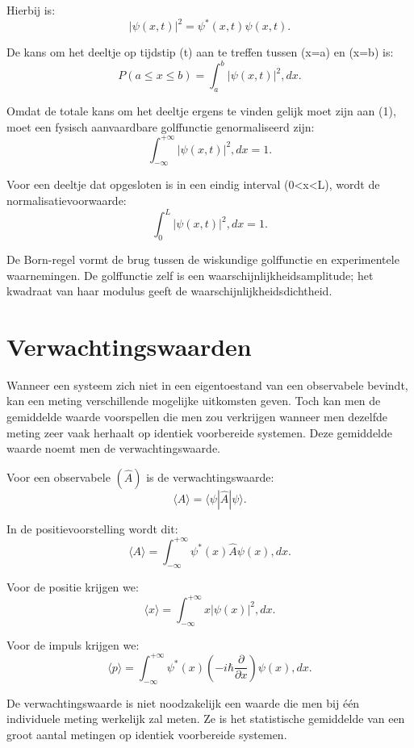 \documentclass{report} %
\begin{document}
    Hierbij is:
    \[
        |\psi(x,t)|^2=\psi^*(x,t)\psi(x,t).
    \]

    De kans om het deeltje op tijdstip (t) aan te treffen tussen (x=a) en (x=b) is:
    \[
        P(a\leq x\leq b)
        =
        \int_a^b |\psi(x,t)|^2,dx.
    \]

    Omdat de totale kans om het deeltje ergens te vinden gelijk moet zijn aan (1), moet een fysisch aanvaardbare golffunctie genormaliseerd zijn:
    \[
        \int_{-\infty}^{+\infty}|\psi(x,t)|^2,dx=1.
    \]

    Voor een deeltje dat opgesloten is in een eindig interval (0<x<L), wordt de normalisatievoorwaarde:
    \[
        \int_0^L |\psi(x,t)|^2,dx=1.
    \]

    De Born-regel vormt de brug tussen de wiskundige golffunctie en experimentele waarnemingen. De golffunctie zelf is een waarschijnlijkheidsamplitude; het kwadraat van haar modulus geeft de waarschijnlijkheidsdichtheid.


    \section{Verwachtingswaarden}

    Wanneer een systeem zich niet in een eigentoestand van een observabele bevindt, kan een meting verschillende mogelijke uitkomsten geven. Toch kan men de gemiddelde waarde voorspellen die men zou verkrijgen wanneer men dezelfde meting zeer vaak herhaalt op identiek voorbereide systemen. Deze gemiddelde waarde noemt men de verwachtingswaarde.

    Voor een observabele $(\hat{A})$ is de verwachtingswaarde:
    \[
        \langle A\rangle
        =
        \langle \psi|\hat{A}|\psi\rangle.
    \]

    In de positievoorstelling wordt dit:
    \[
        \langle A\rangle
        =
        \int_{-\infty}^{+\infty}
        \psi^*(x)\hat{A}\psi(x),dx.
    \]

    Voor de positie krijgen we:
    \[
        \langle x\rangle
        =
        \int_{-\infty}^{+\infty}
        x|\psi(x)|^2,dx.
    \]

    Voor de impuls krijgen we:
    \[
        \langle p\rangle
        =
        \int_{-\infty}^{+\infty}
        \psi^*(x)
        \left(
            -i\hbar\frac{\partial}{\partial x}
        \right)
        \psi(x),dx.
    \]

    De verwachtingswaarde is niet noodzakelijk een waarde die men bij één individuele meting werkelijk zal meten. Ze is het statistische gemiddelde van een groot aantal metingen op identiek voorbereide systemen.
\end{document}
